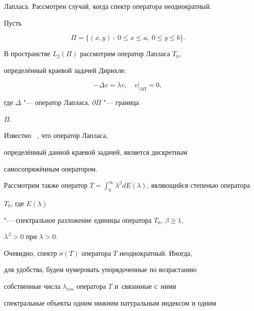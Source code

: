 Лапласа. Рассмотрен случай,  когда спектр оператора неоднократный.



 Пусть


\begin{equation}\label{e1}

\Pi=\{(x, y)\ :\ 0\le x\le a, \ 0\le y\le b \}.

\end{equation}



В пространстве $L_{2}(\Pi)$ рассмотрим оператор Лапласа $T_{0}$, 

определённый краевой задачей Дирихле:


\begin{equation}\label{e_2_0_2}

-\Delta v=\lambda v,  \quad v|_{\partial\Pi}=0, 

\end{equation}

где $\Delta$ "--- оператор Лапласа,  $\partial \Pi$ "--- граница

$\Pi $. 



Известно ~\cite[с. 910]{Danford},  что оператор Лапласа, 

определённый данной краевой задачей,  является дискретным 

самосопряжённым оператором.



Рассмотрим также оператор {$\displaystyle T=\int_{0}^{\infty}

\lambda^{\beta}dE(\lambda)$},  являющийся степенью оператора

$T_{0}$,  где $E(\lambda)$

"--- спектральное разложение единицы оператора $T_{0}$,  $\beta\geq 1$, 

$\displaystyle \lambda^{\beta}>0$ при $\lambda>0 $. 



Очевидно,   спектр $\sigma(T)$ оператора $T$ неоднократный. Иногда, 

для удобства,  будем нумеровать упорядоченные по возрастанию

собственные числа $\lambda_{mn}$ оператора $T$ и~связанные с~ними

спектральные объекты одним нижним натуральным индексом и одним

